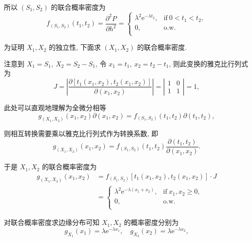 \documentclass[openany]{ctexbook}
\theoremstyle{kaiti}
\theoremstyle{normal}
\begin{document}
  所以 $(S_1,S_2)$ 的联合概率密度为
\begin{equation}
    f_{(S_1,S_2)}(t_1,t_2)=\frac{\partial^2 P}{\partial h^2}=
    \begin{cases}
      \lambda^2\mathrm{e}^{-\lambda t_2}, &\text{if}~0< t_1 < t_2,\\
      0, &\text{o.w.}\\
    \end{cases}
\end{equation}
  
  为证明 $X_1,X_2$ 的独立性, 下面求 $(X_1,X_2)$ 的联合概率密度. 
  
  注意到 $X_1=S_1,~X_2=S_2-S_1$, 令 $x_1=t_1,~x_2=t_2-t_1$, 则此变换的雅克比行列式为
\begin{equation}
    J=\left|\frac{\partial[t_1(x_1,x_2),t_2(x_1,x_2)]}{\partial(x_1,x_2)}\right|=\left|\begin{matrix}1 & 0\\ 1&1\end{matrix}\right|=1,
\end{equation}
  
  此处可以直观地理解为全微分相等
\begin{equation}
    g_{(X_1,X_2)}(x_1,x_2)\partial(x_1,x_2)=f_{(S_1,S_2)}(t_1,t_2)\partial(t_1,t_2),
\end{equation}
  
  则相互转换需要乘以雅克比行列式作为转换系数, 即
\begin{equation}
    g_{(X_1,X_2)}(x_1,x_2)=f_{(S_1,S_2)}(t_1,t_2)\frac{\partial(t_1,t_2)}{\partial(x_1,x_2)}.
\end{equation}
  
  于是 $X_1,X_2$ 的联合概率密度为
\begin{equation}
    \begin{aligned}
      g_{(X_1,X_2)}(x_1,x_2)&=f_{(S_1,S_2)}[t_1(x_1,x_2),t_2(x_1,x_2)]\cdot J\\
      &=\begin{cases}
        \lambda^2\mathrm{e}^{-\lambda (x_1+x_2)}, &\text{if}~x_1,x_2\geqslant0,\\
        0, &\text{o.w.}\\
      \end{cases}
    \end{aligned}
\end{equation}
  
  对联合概率密度求边缘分布可知 $X_1,X_2$ 的概率密度分别为
\begin{equation}
    g_{X_1}(x_1)=\lambda\mathrm{e}^{-\lambda x_1},\quad g_{X_2}(x_2)=\lambda\mathrm{e}^{-\lambda x_2},
\end{equation}
  
\end{document}
